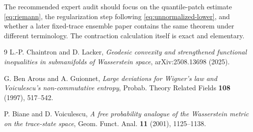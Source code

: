 \documentclass[11pt]{article}
\begin{document}
The recommended expert audit should focus on the quantile-patch estimate
\eqref{eq:riemann}, the regularization step following
\eqref{eq:unnormalized-lower}, and whether a later fixed-trace ensemble paper
contains the same theorem under different terminology. The contraction
calculation itself is exact and elementary.

\begin{thebibliography}{9}
L.-P. Chaintron and D. Lacker,
\emph{Geodesic convexity and strengthened functional inequalities in
submanifolds of Wasserstein space}, arXiv:2508.13698 (2025).

G. Ben Arous and A. Guionnet,
\emph{Large deviations for Wigner's law and Voiculescu's non-commutative
entropy}, Probab. Theory Related Fields \textbf{108} (1997), 517--542.

P. Biane and D. Voiculescu,
\emph{A free probability analogue of the Wasserstein metric on the
trace-state space}, Geom. Funct. Anal. \textbf{11} (2001), 1125--1138.
\end{thebibliography}
\end{document}
